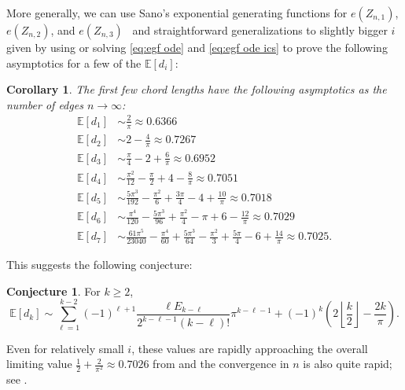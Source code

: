 \documentclass{article}
\newtheorem{corollary}[theorem]{Corollary}
\theoremstyle{definition}
\newtheorem{conjecture}[theorem]{Conjecture}
\begin{document}
More generally, we can use Sano's exponential generating functions for $e(Z_{n,1})$, $e(Z_{n,2})$, and $e(Z_{n,3})$~\cite{sanoPrincipalNumbersSaito2007} and straightforward generalizations to slightly bigger $i$ given by using  or solving \eqref{eq:egf ode} and \eqref{eq:egf ode ics} to prove the following asymptotics for a few of the $\mathbb{E}[d_i]$:

\begin{corollary}\label{prop:chordlength asymptotics}
	The first few chord lengths have the following asymptotics as the number of edges $n \to \infty$:
	\begin{align*}
		\mathbb{E}[d_1] & \sim \frac{2}{\pi} \approx 0.6366 \\
		\mathbb{E}[d_2] & \sim 2-\frac{4}{\pi} \approx 0.7267 \\
		\mathbb{E}[d_3] & \sim \frac{\pi}{4} - 2 + \frac{6}{\pi} \approx 0.6952 \\
		\mathbb{E}[d_4] & \sim \frac{\pi^2}{12} - \frac{\pi}{2} + 4 - \frac{8}{\pi} \approx 0.7051 \\
		\mathbb{E}[d_5] & \sim \frac{5\pi^3}{192} - \frac{\pi^2}{6} + \frac{3\pi}{4} - 4 + \frac{10}{\pi} \approx 0.7018 \\
		\mathbb{E}[d_6] & \sim \frac{\pi^4}{120} - \frac{5\pi^3}{96} + \frac{\pi^2}{4} - \pi + 6 - \frac{12}{\pi} \approx 0.7029 \\
		\mathbb{E}[d_7] & \sim \frac{61 \pi^5}{23040} - \frac{\pi^4}{60} + \frac{5\pi^3}{64} - \frac{\pi^2}{3} + \frac{5\pi}{4} - 6 + \frac{14}{\pi} \approx 0.7025.
	\end{align*}
\end{corollary}

This suggests the following conjecture:
\begin{conjecture}\label{conj:chordlength asymptotics}
	For $k \geq 2$,
	\[
		\mathbb{E}[d_k] \sim \sum_{\ell=1}^{k-2} (-1)^{\ell+1} \frac{\ell E_{k-\ell}}{2^{k-\ell-1}(k-\ell)!} \pi^{k-\ell-1} + (-1)^k \left(2 \left\lfloor \frac{k}{2} \right\rfloor - \frac{2k}{\pi}\right).
                                                                                                    	\]
\end{conjecture}

Even for relatively small $i$, these values are rapidly approaching the overall limiting value $\frac{1}{2} + \frac{2}{\pi^2} \approx 0.7026$ from  and the convergence in $n$ is also quite rapid; see .
\end{document}
